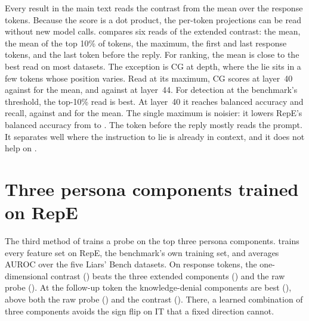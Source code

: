 Every result in the main text reads the contrast from the mean over the response tokens. Because
the score is a dot product, the per-token projections can be read without new model calls.
 compares six reads of the extended contrast: the mean, the mean of the top 10\% of
tokens, the maximum, the first and last response tokens, and the last token before the reply. For
ranking, the mean is close to the best read on most datasets. The exception is CG at depth, where
the lie sits in a few tokens whose position varies. Read at its maximum, CG scores
 at layer~40 against  for the mean, and
 against  at layer~44. For detection at the
benchmark's threshold, the top-10\% read is best. At layer~40 it reaches 
balanced accuracy and  recall, against  and
 for the mean. The single maximum is noisier: it lowers RepE's balanced
accuracy from  to . The token before the reply
mostly reads the prompt. It separates well where the instruction to lie is already in context, and
it does not help on \hpkr.

\begin{table}[h]
\centering
\small
\caption{Six reads of the extended contrast, averaged over the five Liars' Bench datasets: AUROC,
balanced accuracy (BA) and recall at 1\% FPR on Alpaca.}
\label{tab:reads}

\end{table}

\section{Three persona components trained on RepE}
\label{app:kthree}

The third method of \citet{mahadik2026persona} trains a probe on the top three persona components.
 trains every feature set on RepE, the benchmark's own training set, and averages
AUROC over the five Liars' Bench datasets. On response tokens, the one-dimensional contrast
() beats the three extended components () and the raw
probe (). At the follow-up token the knowledge-denial components are best
(), above both the raw probe () and the contrast
(). There, a learned combination of three components avoids the sign flip on IT
that a fixed direction cannot.

